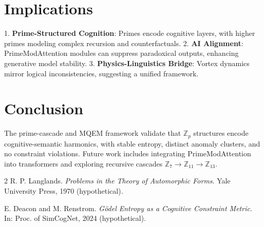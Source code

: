 \documentclass[11pt]{article}
\begin{document}
\section{Implications}
1. \textbf{Prime-Structured Cognition}: Primes encode cognitive layers, with higher primes modeling complex recursion and counterfactuals.
2. \textbf{AI Alignment}: PrimeModAttention modules can suppress paradoxical outputs, enhancing generative model stability.
3. \textbf{Physics-Linguistics Bridge}: Vortex dynamics mirror logical inconsistencies, suggesting a unified framework.

\section{Conclusion}
The prime-cascade and MQEM framework validate that $\mathbb{Z}_p$ structures encode cognitive-semantic harmonics, with stable entropy, distinct anomaly clusters, and no constraint violations. Future work includes integrating PrimeModAttention into transformers and exploring recursive cascades $\mathbb{Z}_7 \to \mathbb{Z}_{11} \to \mathbb{Z}_{13}$.


\begin{thebibliography}{2}
R. P. Langlands. \emph{Problems in the Theory of Automorphic Forms}. Yale University Press, 1970 (hypothetical).

E. Deacon and M. Renstrom. \emph{Gödel Entropy as a Cognitive Constraint Metric}. In: Proc. of SimCogNet, 2024 (hypothetical).
\end{thebibliography}
\end{document}
